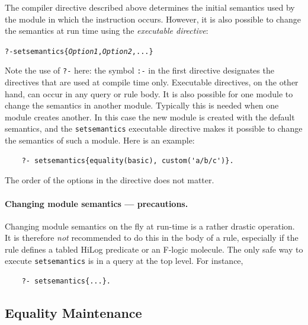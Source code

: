 \documentclass[11pt]{article}
\begin{document}
The compiler directive described above determines the initial semantics used
by the module in which the instruction occurs. However, it is also possible
to change the semantics at run time using the \emph{executable directive}:
\begin{alltt}
    ?- setsemantics\{\emph{Option1}, \emph{Option2}, ...\}
\end{alltt}
Note the use of {\tt ?-} here: the symbol {\tt :-} in the first directive
designates the directives that are used at compile time only.  Executable
directives, on the other hand, can occur in any query or rule body.  It is
also possible for one module to change the semantics in another module.
Typically this is needed when one module creates another. In this case the
new module is created with the default semantics, and the {\tt setsemantics}
executable directive makes it possible to change the semantics of such a
module. Here is an example:
\begin{verbatim}
    ?- setsemantics{equality(basic), custom('a/b/c')}.  
\end{verbatim}
The order of the options in the directive does not matter.

\paragraph{Changing module semantics --- precautions.}
Changing module semantics on the fly at run-time is a rather drastic operation.
It is therefore \emph{not} recommended to do this in the body of a rule,
especially if the rule defines a tabled HiLog predicate or an F-logic molecule.
The only safe way to execute {\tt setsemantics} is in a query at the top
level. For instance, 
  \begin{verbatim}
    ?- setsemantics{...}.
  \end{verbatim}


\subsection{Equality Maintenance}\label{sec-eqmaintain}
\end{document}
